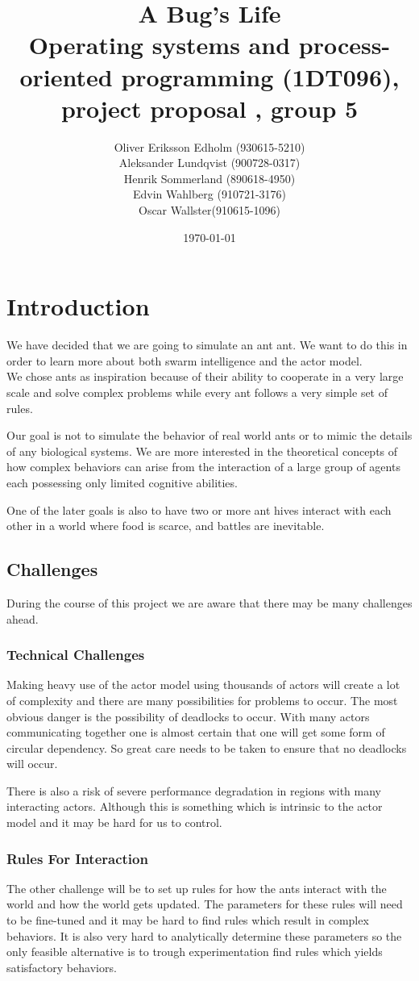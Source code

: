 \documentclass[a4paper]{article}
\title{A Bug's Life\\
 Operating systems and process-oriented programming (1DT096), project proposal
, group 5}
\date{\today}
\author{Oliver Eriksson Edholm (930615-5210) \\
Aleksander Lundqvist (900728-0317) \\
Henrik Sommerland (890618-4950) \\
Edvin Wahlberg (910721-3176) \\
Oscar Wallster(910615-1096)}
\begin{document}
\maketitle 

\section{Introduction}
We have decided that we are going to simulate an ant ant. We want to do
this in order to learn more about both swarm intelligence and the actor
model.\\
We chose ants as inspiration because of their ability to cooperate in a very large
scale and solve complex problems while every ant follows a very simple set of rules.


Our goal is not to simulate the behavior of real world ants or to mimic the
details of any biological systems.
We are more interested in the theoretical concepts of how complex behaviors can
arise from the interaction of a large group of agents each possessing only limited
cognitive abilities.


One of the later goals is also to have two or more ant hives interact with
each other in a world where food is scarce, and battles are inevitable.

\subsection{Challenges}
During the course of this project we are aware that there may be many challenges
ahead.

\subsubsection{Technical Challenges}
Making heavy use of the actor model using thousands of actors will create a lot
of complexity and there are many possibilities for problems to occur. The most
obvious danger is the possibility of deadlocks to occur. With many actors
communicating together one is almost certain that one will get some form of
circular dependency. So great care needs to be taken to ensure that no
deadlocks will occur.

There is also a risk of severe performance degradation in regions with many
interacting actors. Although this is something which is intrinsic to the actor
model and it may be hard for us to control.

\subsubsection{Rules For Interaction}
The other challenge will be to set up rules for how the ants interact with the
world and how the world gets updated. The parameters for these rules will need
to be fine-tuned and it may be hard to find rules which result in complex
behaviors. It is also very hard to analytically determine these parameters so
the only feasible alternative is to trough experimentation find rules which
yields satisfactory behaviors.
\end{document}
